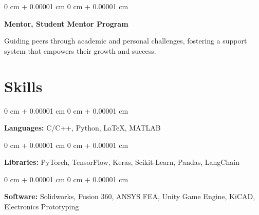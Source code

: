 \documentclass[10pt, letterpaper]{article}
\newenvironment{onecolentry}{
    \begin{adjustwidth}{
        0 cm + 0.00001 cm
    }{
        0 cm + 0.00001 cm
    }
}{
    \end{adjustwidth}
} %
\begin{document}
    \begin{onecolentry}
        \textbf{Mentor, Student Mentor Program}
        
        Guiding peers through academic and personal challenges, fostering a support system that empowers their growth and success.
    \end{onecolentry}

    \section{Skills}

    \begin{onecolentry}
        \textbf{Languages:} C/C++, Python, LaTeX, MATLAB
    \end{onecolentry}

    \vspace{0.2 cm}

    \begin{onecolentry}
        \textbf{Libraries:} PyTorch, TensorFlow, Keras, Scikit-Learn, Pandas, LangChain
    \end{onecolentry}

    \vspace{0.2 cm}

    \begin{onecolentry}
        \textbf{Software:} Solidworks, Fusion 360, ANSYS FEA, Unity Game Engine, KiCAD, Electronics Prototyping
    \end{onecolentry}
\end{document}

